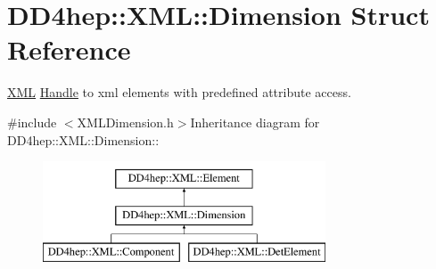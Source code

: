 \hypertarget{struct_d_d4hep_1_1_x_m_l_1_1_dimension}{
\section{DD4hep::XML::Dimension Struct Reference}
\label{struct_d_d4hep_1_1_x_m_l_1_1_dimension}
}


\hyperlink{namespace_d_d4hep_1_1_x_m_l}{XML} \hyperlink{class_d_d4hep_1_1_handle}{Handle} to xml elements with predefined attribute access.  


{\ttfamily \#include $<$XMLDimension.h$>$}Inheritance diagram for DD4hep::XML::Dimension::\begin{figure}[H]
\begin{center}
\leavevmode
\includegraphics[height=3cm]{struct_d_d4hep_1_1_x_m_l_1_1_dimension}
\end{center}
\end{figure}
